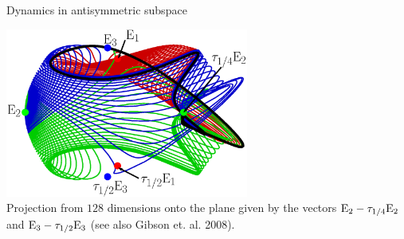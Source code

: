 \documentclass{beamer}
\begin{document}

\begin{frame}{Dynamics in antisymmetric subspace}
 \begin{centering}
         \includegraphics[width=0.6\textwidth]{../../figs/KS22hetero} \\
	Projection from $128$ dimensions onto the plane given by the vectors 
	$\mathrm{E}_{2}-\tau_{1/4}\mathrm{E}_{2}$ and $\mathrm{E}_{3}-\tau_{1/2}\mathrm{E}_{3}$ (see also Gibson et. al. 2008).
 \end{centering}
\end{frame}
\end{document}
